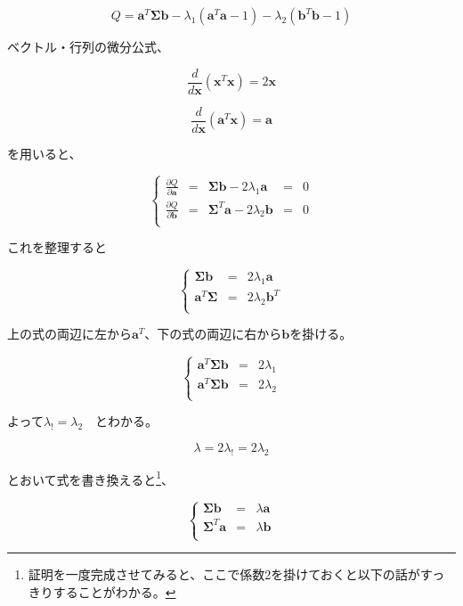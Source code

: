 \[Q = {\mathbf a}^T{\mathbf \Sigma}{\mathbf b}-\lambda_1({\mathbf a}^T{\mathbf a}-1)-\lambda_2({\mathbf b}^T{\mathbf b}-1)\]

ベクトル・行列の微分公式、

\[\frac{ d }{d{\mathbf x}} ( {\mathbf x}^T {\mathbf x} ) = 2{\mathbf x}\]

\[\frac{ d }{d{\mathbf x}} ( {\mathbf a}^T {\mathbf x} ) = {\mathbf a}\]

を用いると、

\[
\left\{
\begin{array}{lclcl}
\frac{\partial Q}{\partial {\mathbf a}} & = & {\mathbf \Sigma}{\mathbf b} - 2\lambda_1 {\mathbf a} & = & 0 \\
\frac{\partial Q}{\partial {\mathbf b}} & = & {\mathbf \Sigma}^T{\mathbf a} - 2\lambda_2 {\mathbf b} & = & 0 \\
\end{array}
\right.
\]

これを整理すると

\[
\left\{
\begin{array}{lcl}
{\mathbf \Sigma}{\mathbf b} & = & 2\lambda_1 {\mathbf a}\\
{\mathbf a}^T{\mathbf \Sigma} & = & 2\lambda_2 {\mathbf b}^T\\
\end{array}
\right.
\]

上の式の両辺に左から\({\mathbf a}^T\)、下の式の両辺に右から\({\mathbf b}\)を掛ける。

\[
\left\{
\begin{array}{lcl}
{\mathbf a}^T{\mathbf \Sigma}{\mathbf b} & = & 2\lambda_1 \\
{\mathbf a}^T{\mathbf \Sigma}{\mathbf b} & = & 2\lambda_2 \\
\end{array}
\right.
\]

よって\(\lambda_! = \lambda_2\)　とわかる。

\[\lambda = 2\lambda_! = 2\lambda_2\]

とおいて式を書き換えると\footnote{証明を一度完成させてみると、ここで係数2を掛けておくと以下の話がすっきりすることがわかる。}、

\[
\left\{
\begin{array}{lcl}
{\mathbf \Sigma}{\mathbf b} & = & \lambda {\mathbf a}\\
{\mathbf \Sigma}^T {\mathbf a} & = & \lambda {\mathbf b}\\
\end{array}
\right.
\]

